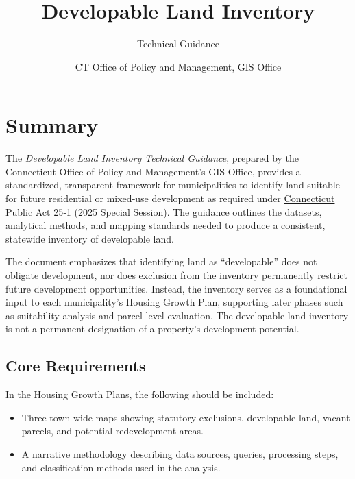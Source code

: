 \documentclass[
  letterpaper,
  DIV=11,
  numbers=noendperiod]{scrreprt}
\title{Developable Land Inventory}
\subtitle{Technical Guidance}
\author{CT Office of Policy and Management, GIS Office}
\date{}
\renewcommand*\contentsname{Table of contents}
\newcommand\contentsname{Table of contents}
\begin{document}
\maketitle

\renewcommand*\contentsname{Table of contents}
{
\setcounter{tocdepth}{4}
\tableofcontents
}


\chapter*{Summary}\label{summary}


The \emph{Developable Land Inventory Technical Guidance}, prepared by
the Connecticut Office of Policy and Management's GIS Office, provides a
standardized, transparent framework for municipalities to identify land
suitable for future residential or mixed‑use development as required
under
\href{https://www.cga.ct.gov/asp/cgabillstatus/cgabillstatus.asp?selBillType=Bill&which_year=2025&bill_num=8002}{Connecticut
Public Act 25‑1 (2025 Special Session)}. The guidance outlines the
datasets, analytical methods, and mapping standards needed to produce a
consistent, statewide inventory of developable land.

The document emphasizes that identifying land as ``developable'' does
not obligate development, nor does exclusion from the inventory
permanently restrict future development opportunities. Instead, the
inventory serves as a foundational input to each municipality's Housing
Growth Plan, supporting later phases such as suitability analysis and
parcel‑level evaluation. The developable land inventory is not a
permanent designation of a property's development potential.

\section*{Core Requirements}\label{core-requirements}


In the Housing Growth Plans, the following should be included:

\begin{itemize}
\item
  Three town‑wide maps showing statutory exclusions, developable land,
  vacant parcels, and potential redevelopment areas.
\item
  A narrative methodology describing data sources, queries, processing
  steps, and classification methods used in the analysis.
\end{itemize}
\end{document}

